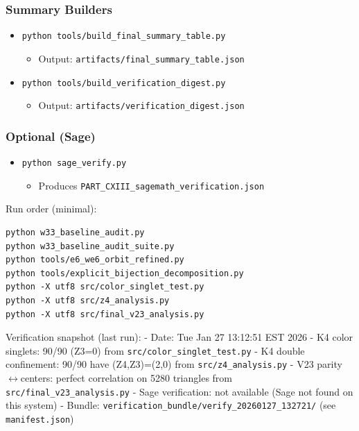 \documentclass[11pt]{article}
\providecommand{\tightlist}{%
  \setlength{\itemsep}{0pt}\setlength{\parskip}{0pt}}
\begin{document}
\subsubsection{Summary Builders}\label{summary-builders}

\begin{itemize}
\tightlist
\item
  \texttt{python\ tools/build\_final\_summary\_table.py}

  \begin{itemize}
  \tightlist
  \item
    Output: \texttt{artifacts/final\_summary\_table.json}
  \end{itemize}
\item
  \texttt{python\ tools/build\_verification\_digest.py}

  \begin{itemize}
  \tightlist
  \item
    Output: \texttt{artifacts/verification\_digest.json}
  \end{itemize}
\end{itemize}

\subsubsection{Optional (Sage)}\label{optional-sage}

\begin{itemize}
\tightlist
\item
  \texttt{python\ sage\_verify.py}

  \begin{itemize}
  \tightlist
  \item
    Produces \texttt{PART\_CXIII\_sagemath\_verification.json}
  \end{itemize}
\end{itemize}

Run order (minimal):

\begin{verbatim}
python w33_baseline_audit.py
python w33_baseline_audit_suite.py
python tools/e6_we6_orbit_refined.py
python tools/explicit_bijection_decomposition.py
python -X utf8 src/color_singlet_test.py
python -X utf8 src/z4_analysis.py
python -X utf8 src/final_v23_analysis.py
\end{verbatim}

Verification snapshot (last run): - Date: Tue Jan 27 13:12:51 EST 2026 -
K4 color singlets: 90/90 (Z3=0) from
\texttt{src/color\_singlet\_test.py} - K4 double confinement: 90/90 have
(Z4,Z3)=(2,0) from \texttt{src/z4\_analysis.py} - V23
parity\ensuremath{\leftrightarrow}centers: perfect correlation on 5280
triangles from \texttt{src/final\_v23\_analysis.py} - Sage verification:
not available (Sage not found on this system) - Bundle:
\texttt{verification\_bundle/verify\_20260127\_132721/} (see
\texttt{manifest.json})
\end{document}
